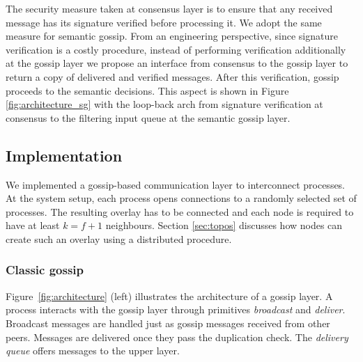 The security measure taken at consensus layer is to ensure that any received message has its signature verified
before processing it.   We adopt the same measure for semantic gossip.
From an engineering perspective, since signature verification is a costly procedure, 
instead of performing verification additionally at the gossip layer we propose an interface from consensus to the gossip layer 
to return a copy of delivered and verified messages.   After this verification, gossip proceeds to the semantic decisions.
This aspect is shown in Figure \ref{fig:architecture_sg} with the loop-back arch from signature verification at consensus 
to the filtering input queue at the semantic gossip layer.





\subsection{Implementation}
\label{sec:impl}


We implemented a gossip-based communication layer to interconnect processes.
At the system setup, each process opens connections to a randomly selected set
of processes.  The resulting overlay has to be connected and each node is required to have at least $k=f+1$ neighbours.
Section \ref{sec:topos} discusses how nodes can create such an overlay using a distributed procedure.


\subsubsection{Classic gossip}

Figure~\ref{fig:architecture} (left) illustrates the architecture of a gossip layer.
A process interacts with the gossip layer through primitives {\em broadcast} and {\em deliver}.   Broadcast messages are handled just as gossip messages received from other peers.   Messages are delivered once they pass the duplication check.
The {\em delivery queue} offers messages to the upper layer.

